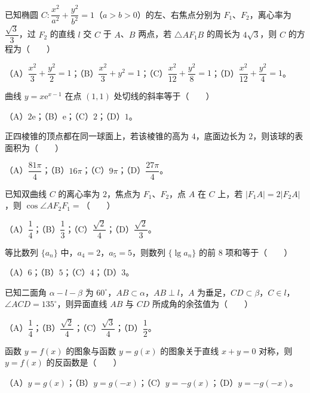 \begin{question}
已知椭圆 $C:\dfrac{x^2}{a^2}+\dfrac{y^2}{b^2}=1$（$a>b>0$）的左、右焦点分别为 $F_1$、$F_2$，离心率为 $\dfrac{\sqrt3}{3}$，过 $F_2$ 的直线 $l$ 交 $C$ 于 $A$、$B$ 两点，若 $\triangle AF_1B$ 的周长为 $4\sqrt3$，则 $C$ 的方程为\mbox{（　　）}

（A）$\dfrac{x^2}{3}+\dfrac{y^2}{2}=1$；（B）$\dfrac{x^2}{3}+y^2=1$；（C）$\dfrac{x^2}{12}+\dfrac{y^2}{8}=1$；（D）$\dfrac{x^2}{12}+\dfrac{y^2}{4}=1$。

\end{question}
\begin{question}
曲线 $y=x\mathrm e^{x-1}$ 在点 $(1,1)$ 处切线的斜率等于\mbox{（　　）}

（A）$2\mathrm e$；（B）$\mathrm e$；（C）$2$；（D）$1$。

\end{question}
\begin{question}
正四棱锥的顶点都在同一球面上，若该棱锥的高为 $4$，底面边长为 $2$，则该球的表面积为\mbox{（　　）}

（A）$\dfrac{81\pi}{4}$；（B）$16\pi$；（C）$9\pi$；（D）$\dfrac{27\pi}{4}$。

\end{question}
\begin{question}
已知双曲线 $C$ 的离心率为 $2$，焦点为 $F_1$、$F_2$，点 $A$ 在 $C$ 上，若 $|F_1A|=2|F_2A|$，则 $\cos\angle AF_2F_1=$\mbox{（　　）}

（A）$\dfrac14$；（B）$\dfrac13$；（C）$\dfrac{\sqrt2}{4}$；（D）$\dfrac{\sqrt2}{3}$。

\end{question}
\begin{question}
等比数列 $\{a_n\}$ 中，$a_4=2$，$a_5=5$，则数列 $\{\lg a_n\}$ 的前 $8$ 项和等于\mbox{（　　）}

（A）$6$；（B）$5$；（C）$4$；（D）$3$。

\end{question}
\begin{question}
已知二面角 $\alpha-l-\beta$ 为 $60^\circ$，$AB\subset\alpha$，$AB\perp l$，$A$ 为垂足，$CD\subset\beta$，$C\in l$，$\angle ACD=135^\circ$，则异面直线 $AB$ 与 $CD$ 所成角的余弦值为\mbox{（　　）}

（A）$\dfrac14$；（B）$\dfrac{\sqrt2}{4}$；（C）$\dfrac{\sqrt3}{4}$；（D）$\dfrac12$。

\end{question}
\begin{question}
函数 $y=f(x)$ 的图象与函数 $y=g(x)$ 的图象关于直线 $x+y=0$ 对称，则 $y=f(x)$ 的反函数是\mbox{（　　）}

（A）$y=g(x)$；（B）$y=g(-x)$；（C）$y=-g(x)$；（D）$y=-g(-x)$。

\end{question}

